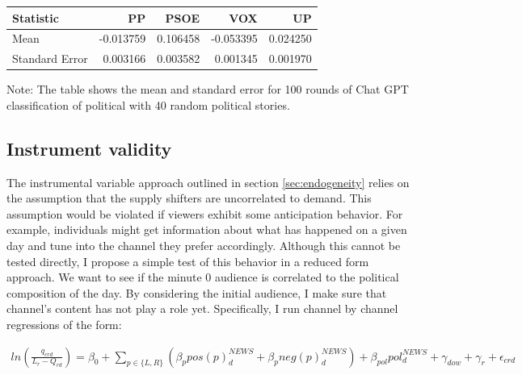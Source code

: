 \documentclass[12pt]{article}
\begin{document}
	
	\begin{table}
		
		\centering
		\begin{tabular}{lrrrr}
			\hline
			Statistic       &       PP &     PSOE &      VOX &       UP \\
			\hline
			Mean            & -0.013759 &  0.106458 & -0.053395 &  0.024250 \\
			Standard Error  &  0.003166 &  0.003582 &  0.001345 &  0.001970 \\
			\hline
			
		\end{tabular}
		
		\begin{tablenotes}
			\centering
			\footnotesize
			\item Note: The table shows the mean and standard error for 100 rounds of Chat GPT classification of political with 40 random political stories.
		\end{tablenotes}
	\end{table}
	
	

	
	
	\subsection{Instrument validity}
	
	
	The instrumental variable approach outlined in section \ref{sec:endogeneity} relies on the assumption that the supply shifters are uncorrelated to demand. This assumption would be violated if viewers exhibit some anticipation behavior. For example, individuals might get information about what has happened on a given day and tune into the channel they prefer accordingly. Although this cannot be tested directly, I propose a simple test of this behavior in a reduced form approach. We want to see if the minute 0 audience is correlated to the political composition of the day. By considering the initial audience, I make sure that channel's content has not play a role yet. Specifically, I run channel by channel regressions of the form: 
	
	\begin{equation}\label{eq:check_exogeneity}
		\begin{aligned}
			ln\left( \frac{q_{crd}}{L_{r}-Q_{rd}}  \right) = \beta_0 + \sum_{p \in \{L,R\}}\left(\beta_p pos(p)^{NEWS}_d + \beta_p neg(p)^{NEWS}_d \right)+ \beta_{pol} pol^{NEWS}_d + \gamma_{dow} + \gamma_r + \epsilon_{crd}
		\end{aligned}
	\end{equation} 
	
\end{document}
